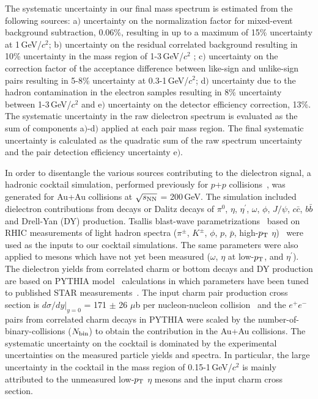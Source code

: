 \documentclass[twocolumn,showpacs,amsmath,amssymb,superscriptaddress,nofootinbib]{revtex4-1}
\newcommand{\sNN}{$\sqrt{s_{\rm NN}}$ }
\begin{document}
The systematic uncertainty in our final mass spectrum is estimated from the following sources: a$)$ uncertainty on the normalization factor for mixed-event background subtraction, 0.06\%, resulting in up to a maximum of 15\% uncertainty at 1\,GeV/$c^2$; b$)$ uncertainty on the residual correlated background resulting in 10\% uncertainty in the mass region of 1-3\,GeV/$c^2$ ; c$)$ uncertainty on the correction factor of the acceptance difference between like-sign and unlike-sign pairs resulting in 5-8\% uncertainty at 0.3-1\,GeV/$c^2$; d$)$ uncertainty due to the hadron contamination in the electron samples resulting in 8\% uncertainty between 1-3\,GeV/$c^2$ and e$)$ uncertainty on the detector efficiency correction, 13\%. The systematic uncertainty in the raw dielectron spectrum is evaluated as the sum of components a$)$-d$)$ applied at each pair mass region. The final systematic uncertainty is calculated as the quadratic sum of the raw spectrum uncertainty and the pair detection efficiency uncertainty e$)$.

In order to disentangle the various sources contributing to the dielectron signal, a hadronic cocktail simulation, performed previously for $p$+$p$ collisions~\cite{STARpp}, was generated for Au+Au collisions at \sNN = 200\,GeV. The simulation included dielectron contributions from decays or Dalitz decays of $\pi^{0}$, $\eta$, $\eta^{\prime}$, $\omega$, $\phi$, $J/\psi$, $c\bar{c}$, $b\bar{b}$ and Drell-Yan (DY) production.
Tsallis blast-wave parametrizations~\cite{TBW} based on RHIC measurements of light hadron spectra ($\pi^{\pm}$, $K^{\pm}$, $\phi$, $p$, $\bar{p}$, high-$p_{\rm T}$ $\eta$)~\cite{DataPion,DataEta,DataPhi,DataJpsi} were used as the inputs to our cocktail simulations.
The same parameters were also applied to mesons which have not yet been measured ($\omega$, $\eta$ at low-$p_{\rm T}$, and $\eta^{\prime}$). The dielectron yields from correlated charm or bottom decays and DY production are based on PYTHIA model~\cite{pythia} calculations in which parameters have been tuned to published STAR measurements~\cite{DataCharm}.
The input charm pair production cross section is $d\sigma/dy|_{y=0}$ = 171 $\pm$ 26 $\mu$b per nucleon-nucleon collision~\cite{DataCharm} and the $e^+e^-$ pairs from correlated charm decays in PYTHIA were scaled by the number-of-binary-collisions ($N_{\rm bin}$) to obtain the contribution in the Au+Au collisions.
The systematic uncertainty on the cocktail is dominated by the experimental uncertainties on the measured particle yields and spectra. In particular, the large uncertainty in the cocktail in the mass region of 0.15-1\,GeV/$c^2$ is mainly attributed to the unmeasured low-$p_{\rm T}$ $\eta$ mesons and the input charm cross section.
\end{document}

